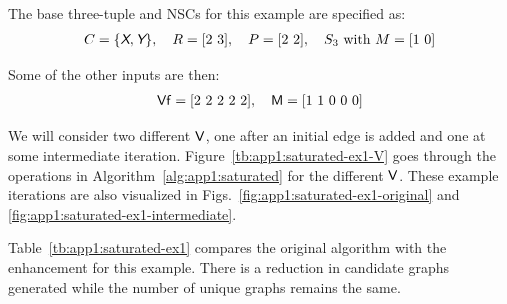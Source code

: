 The base three-tuple and NSCs for this example are specified as:
\begin{align}
C = \{ \textsl{\textsf{X}}, \textsl{\textsf{Y}} \}, \quad R = [2\ 3], \quad P = [2\ 2], \quad S_3 \text{ with } M = [1\ 0]
\end{align}

\noindent Some of the other inputs are then:
\begin{align}
\textup{\textsf{Vf}} = [2\ 2\ 2\ 2\ 2], \quad \textup{\textsf{M}} = [1\ 1\ 0\ 0\ 0]
\end{align}

\noindent We will consider two different $\textup{\textsf{V}}$, one after an initial edge is added and one at some intermediate iteration. Figure~\ref{tb:app1:saturated-ex1-V} goes through the operations in Algorithm~\ref{alg:app1:saturated} for the different $\textup{\textsf{V}}$.
These example iterations are also visualized in Figs.~\ref{fig:app1:saturated-ex1-original} and \ref{fig:app1:saturated-ex1-intermediate}.

Table~\ref{tb:app1:saturated-ex1} compares the original algorithm with the enhancement for this example. There is a reduction in candidate graphs generated while the number of unique graphs remains the same.

